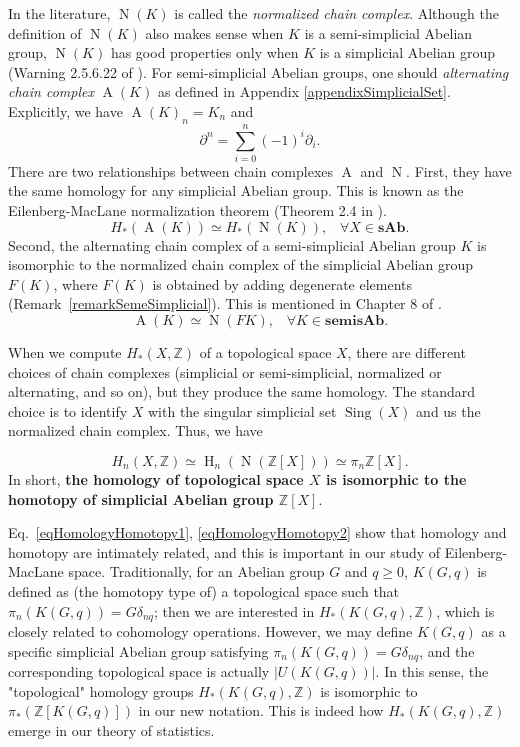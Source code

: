 \documentclass[reprint, amsmath, amssymb, showpacs, floatfix, longbibliography, aps, twocolumn, superscriptaddress, nofootinbib]{revtex4-2}
\newcommand{\ZZ}{{\mathbb Z}}
\theoremstyle{definition}
\begin{document}
In the literature, $\operatorname{N}(K)$ is called the \textit{normalized chain complex}. Although the definition of $\operatorname{N}(K)$ also makes sense when $K$ is a semi-simplicial Abelian group, $\operatorname{N}(K)$ has good properties only when $K$ is a simplicial Abelian group (Warning 2.5.6.22 of \cite{kerodon}). For semi-simplicial Abelian groups, one should \textit{alternating chain complex} $\operatorname{A}(K)$ as defined in Appendix \ref{appendixSimplicialSet}. Explicitly, we have $\operatorname{A}(K)_n=K_n$ and 
\begin{equation}
	\partial^n=\sum_{i=0}^n(-1)^i\partial_i.
\end{equation}
There are two relationships between chain complexes $\operatorname{A}$ and $\operatorname{N}$. First, they have the same homology for any simplicial Abelian group. This is known as the Eilenberg-MacLane normalization theorem (Theorem 2.4 in \cite{goerss-2009}).
\begin{equation}
	H_*(\operatorname{A}(K))\simeq H_*(\operatorname{N}(K)),\;\;\;\forall X\in \mathbf{sAb}.
\end{equation}
Second, the alternating chain complex of a semi-simplicial Abelian group $K$ is isomorphic to the normalized chain complex of the simplicial Abelian group $F(K)$, where $F(K)$ is obtained by adding degenerate elements (Remark~\ref{remarkSemeSimplicial}). This is mentioned in Chapter 8 of \cite{Weibel_1994}.
\begin{equation}
	\operatorname{A}(K)\simeq \operatorname{N}(FK),\;\;\;\forall K\in \mathbf{semisAb}.
\end{equation}


When we compute $H_*(X,\ZZ)$ of a topological space $X$, there are different choices of chain complexes (simplicial or semi-simplicial, normalized or alternating, and so on), but they produce the same homology. The standard choice is to identify $X$ with the singular simplicial set $\operatorname{Sing}(X)$ and us the normalized chain complex. Thus, we have

\begin{equation}\label{eqHomologyHomotopy2}
	H_n(X,\ZZ)\simeq \operatorname{H}_n(\operatorname{N}(\ZZ[X]))\simeq \pi_n\ZZ[X].
\end{equation}
In short, \textbf{the homology of topological space $X$ is isomorphic to the homotopy of simplicial Abelian group $\ZZ[X]$}.



Eq.~\eqref{eqHomologyHomotopy1}, \eqref{eqHomologyHomotopy2} show that homology and homotopy are intimately related, and this is important in our study of Eilenberg-MacLane space. Traditionally, for an Abelian group $G$ and $q\ge0$, $K(G,q)$ is defined as (the homotopy type of) a topological space such that $\pi_n(K(G,q))=G\delta_{nq}$; then we are interested in $H_*(K(G,q),\ZZ)$, which is closely related to cohomology operations. However, we may define $K(G,q)$ as a specific simplicial Abelian group satisfying $\pi_n(K(G,q))=G\delta_{nq}$, and the corresponding topological space is actually $|U(K(G,q))|$. In this sense, the "topological" homology groups $H_*(K(G,q),\ZZ)$ is isomorphic to $\pi_*(\ZZ[K(G,q)])$ in our new notation. This is indeed how $H_*(K(G,q),\ZZ)$ emerge in our theory of statistics.
\end{document}

